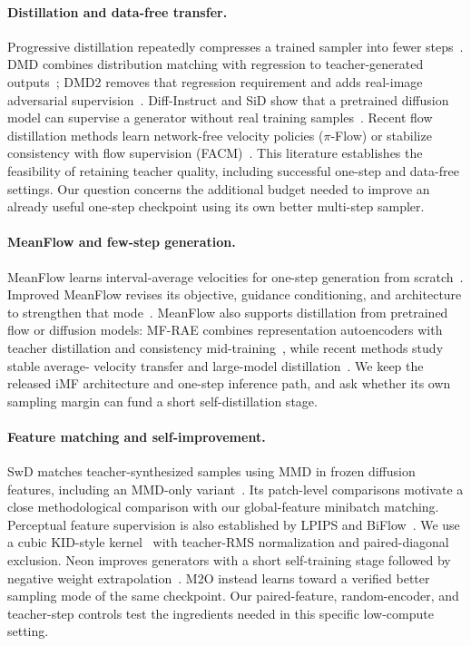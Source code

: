 \documentclass{article}
\begin{document}
\paragraph{Distillation and data-free transfer.}
Progressive distillation repeatedly compresses a trained sampler into fewer
steps~\citep{salimans2022progressive}. DMD combines distribution matching
with regression to teacher-generated outputs~\citep{yin2023dmd}; DMD2
removes that regression requirement and adds real-image adversarial
supervision~\citep{yin2024dmd2}. Diff-Instruct and SiD show that a pretrained
diffusion model can supervise a generator without real training
samples~\citep{luo2023diffinstruct,zhou2024sid}. Recent flow distillation
methods learn network-free velocity policies ($\pi$-Flow) or stabilize
consistency with flow supervision (FACM)~\citep{chen2025piflow,peng2025facm}.
This literature establishes
the feasibility of retaining teacher quality, including successful one-step
and data-free settings. Our question concerns the additional budget needed
to improve an already useful one-step checkpoint using its own better
multi-step sampler.

\paragraph{MeanFlow and few-step generation.}
MeanFlow learns interval-average velocities for one-step generation from
scratch~\citep{geng2025meanflow}. Improved MeanFlow revises its objective,
guidance conditioning, and architecture to strengthen that
mode~\citep{geng2025improved}. MeanFlow also supports distillation from
pretrained flow or diffusion models: MF-RAE combines representation
autoencoders with teacher distillation and consistency
mid-training~\citep{hu2025mfrae}, while recent methods study stable average-
velocity transfer and large-model distillation~\citep{zhao2026mfd,he2026stabilizing}.
We keep the released iMF architecture and one-step inference path, and ask
whether its own sampling margin can fund a short self-distillation stage.

\paragraph{Feature matching and self-improvement.}
SwD matches teacher-synthesized samples using MMD in frozen diffusion
features, including an MMD-only variant~\citep{starodubcev2026swd}.
Its patch-level comparisons motivate a close methodological comparison with
our global-feature minibatch matching. Perceptual feature supervision is
also established by LPIPS and BiFlow~\citep{zhang2018perceptual,lu2025biflow}.
We use a cubic KID-style kernel~\citep{binkowski2018mmd} with teacher-RMS
normalization and paired-diagonal exclusion. Neon improves generators with a
short self-training stage followed by negative weight
extrapolation~\citep{alemohammad2025neon}. M2O instead learns toward a
verified better sampling mode of the same checkpoint. Our paired-feature,
random-encoder, and teacher-step controls test the ingredients needed in
this specific low-compute setting.
\end{document}
